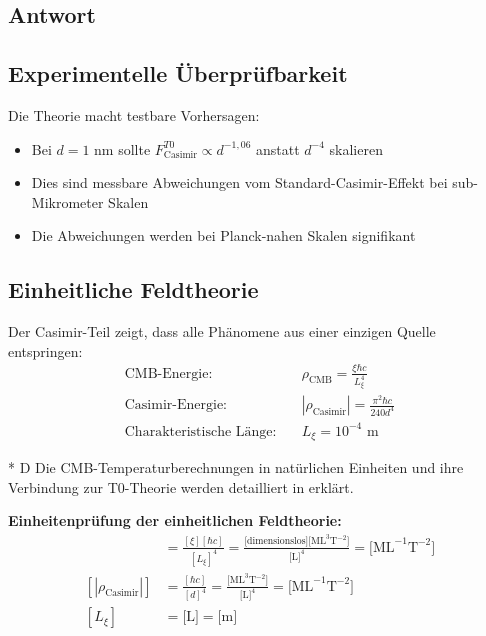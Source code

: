 \documentclass[12pt,a4paper]{article}
\theoremstyle{remark}
\newenvironment{answer}{\subsection*{Antwort}}{\vspace{1em}}
\begin{document}
\begin{answer}
	\subsection{Experimentelle Überprüfbarkeit}
	
	Die Theorie macht testbare Vorhersagen:
	\begin{itemize}
		\item Bei $d = 1$ nm sollte $F_{\text{Casimir}}^{T0} \propto d^{-1{,}06}$ anstatt $d^{-4}$ skalieren
		\item Dies sind messbare Abweichungen vom Standard-Casimir-Effekt bei sub-Mikrometer Skalen
		\item Die Abweichungen werden bei Planck-nahen Skalen signifikant
	\end{itemize}
	
	\subsection{Einheitliche Feldtheorie}
	
	Der Casimir-Teil zeigt, dass alle Phänomene aus einer einzigen Quelle entspringen:
	\begin{align}
		\text{CMB-Energie:} \quad &\rho_{\text{CMB}} = \frac{\xi \hbar c}{L_\xi^4} \\
		\text{Casimir-Energie:} \quad &|\rho_{\text{Casimir}}| = \frac{\pi^2 \hbar c}{240d^4} \\
		\text{Charakteristische Länge:} \quad &L_\xi = 10^{-4} \text{ m}
	\end{align}
	
	\begin{important}[title=Temperatureinheiten und CMB]
		* D Die CMB-Temperaturberechnungen in natürlichen Einheiten und ihre Verbindung zur T0-Theorie werden detailliert in \cite{pascher_temp_einheiten_2025} erklärt.
	\end{important}
	
	\begin{units}
		\textbf{Einheitenprüfung der einheitlichen Feldtheorie:}
		\begin{align}
			[\rho_{\text{CMB}}] &= \frac{[\xi][\hbar c]}{[L_\xi]^4} = \frac{\text{[dimensionslos][ML}^3\text{T}^{-2}\text{]}}{\text{[L]}^4} = \text{[ML}^{-1}\text{T}^{-2}\text{]} \\
			[|\rho_{\text{Casimir}}|] &= \frac{[\hbar c]}{[d]^4} = \frac{\text{[ML}^3\text{T}^{-2}\text{]}}{\text{[L]}^4} = \text{[ML}^{-1}\text{T}^{-2}\text{]} \\
			[L_\xi] &= \text{[L]} = \text{[m]}
		\end{align}
		

\end{units}
\end{answer}
\end{document}
